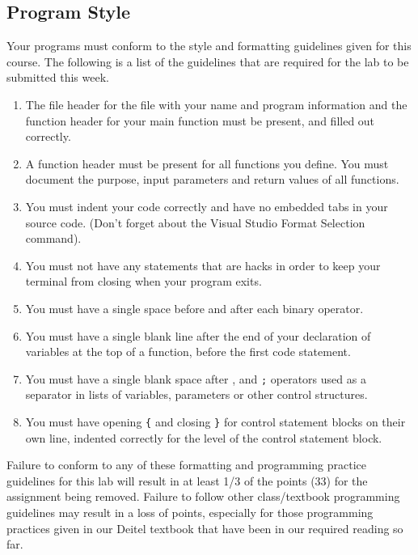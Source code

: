 \documentclass[11pt]{article}
\begin{document}
\subsection*{Program Style}
\label{sec-5-2}


Your programs must conform to the style and formatting guidelines given for this course.
The following is a list of the guidelines that are required for the lab to be submitted
this week.

\begin{enumerate}
\item The file header for the file with your name and program information
  and the function header for your main function must be present, and
  filled out correctly.
\item A function header must be present for all functions you define.
  You must document the purpose, input parameters and return values
  of all functions.
\item You must indent your code correctly and have no embedded tabs in
  your source code. (Don't forget about the Visual Studio Format
  Selection command).
\item You must not have any statements that are hacks in order to keep
  your terminal from closing when your program exits.
\item You must have a single space before and after each binary operator.
\item You must have a single blank line after the end of your declaration
  of variables at the top of a function, before the first code
  statement.
\item You must have a single blank space after , and \verb~;~ operators used as a
  separator in lists of variables, parameters or other control
  structures.
\item You must have opening \verb~{~ and closing \verb~}~ for control statement blocks
  on their own line, indented correctly for the level of the control
  statement block.
\end{enumerate}

Failure to conform to any of these formatting and programming practice
guidelines for this lab will result in at least 1/3 of the points (33)
for the assignment being removed.  Failure to follow other
class/textbook programming guidelines may result in a loss of points,
especially for those programming practices given in our Deitel
textbook that have been in our required reading so far.
\end{document}
